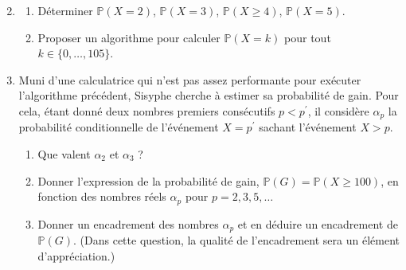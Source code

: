 \documentclass[landscape,twocolumn,leqno,a4paper,10pt]{report} %
\renewcommand{\geq}{\geqslant}
\newcommand{\Prob}{\mathbb{P}}
\begin{document}
\begin{enumerate}\setcounter{enumi}{1}
	\item \begin{enumerate}
		\item Déterminer $\Prob(X=2)$, $\Prob(X=3)$, $\Prob(X \geq 4)$, $\Prob(X=5)$.
		\item Proposer un algorithme pour calculer $\Prob(X=k)$ pour tout $k \in\{0, \ldots, 105\}$.
	\end{enumerate}
	\item Muni d'une calculatrice qui n'est pas assez performante pour exécuter l'algorithme précédent, Sisyphe cherche à estimer sa probabilité de gain. Pour cela, étant donné deux nombres premiers consécutifs $p<p^{\prime}$, il considère $\alpha_{p}$ la probabilité conditionnelle de l'événement $X=p^{\prime}$ sachant l'événement $X>p$.
	\begin{enumerate}
		\item Que valent $\alpha_{2}$ et $\alpha_{3}$ ?
		\item Donner l'expression de la probabilité de gain, $\Prob(G)=\Prob(X \geq 100)$, en fonction des nombres réels $\alpha_{p}$ pour $p=2,3,5, \ldots$
		\item Donner un encadrement des nombres $\alpha_{p}$ et en déduire un encadrement de $\Prob(G)$. (Dans cette question, la qualité de l'encadrement sera un élément d'appréciation.)
	\end{enumerate}
\end{enumerate}
\end{document}
